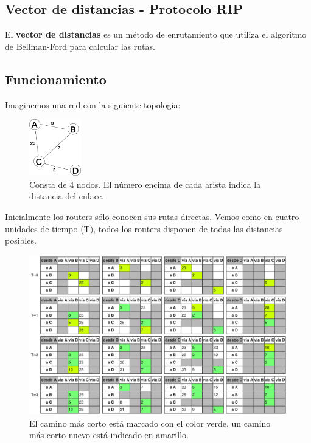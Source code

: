 \begin{onepage}
    \section{Vector de distancias - Protocolo RIP}
    El \textbf{vector de distancias} es un método de enrutamiento que utiliza el algoritmo de Bellman-Ford para calcular las rutas.
    \subsection{Funcionamiento}
    Imaginemos una red con la siguiente topología:
    \begin{figure}[H]
    \centering \includegraphics[width=0.2\textwidth]{img/VectorDeDistanciasEj1.png}
    \caption{Consta de 4 nodos. El número encima de cada arista indica la distancia del enlace.}
    \end{figure}
    Inicialmente los routers sólo conocen sus rutas directas. Vemos como en cuatro unidades de tiempo (T), todos los routers disponen de todas las distancias posibles.
    \begin{figure}[H]
    \centering \includegraphics[width=1.1\textwidth]{img/VectorDeDistanciasEj2.png}
    \caption{El camino más corto está marcado con el color verde, un camino más corto nuevo está indicado en amarillo.}
    \end{figure}
    \end{onepage}
    
